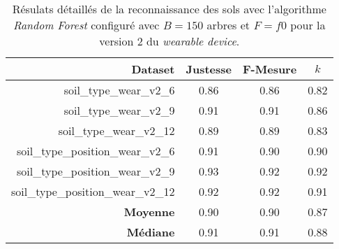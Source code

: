 \begin{table}[H]\renewcommand{\arraystretch}{0.5}
	\centering
	\caption{Résulats détaillés de la reconnaissance des sols avec l'algorithme \textit{Random Forest} configuré avec $B=150$ arbres et $F=f0$ pour la version 2 du \textit{wearable device}.}
	\label{tab:tab:rf-150-f0-wear-v2}
	\begin{tabular}{@{}rccc@{}}
		\toprule
			\textbf{Dataset} & \textbf{Justesse} & \textbf{F-Mesure} & \textbf{$k$} \\
		\midrule
			soil\_type\_wear\_v2\_6 & 0.86 & 0.86 & 0.82 \\
			soil\_type\_wear\_v2\_9 & 0.91 & 0.91 & 0.86 \\
			soil\_type\_wear\_v2\_12 & 0.89 & 0.89 & 0.83 \\
			soil\_type\_position\_wear\_v2\_6 & 0.91 & 0.90 & 0.90 \\
			soil\_type\_position\_wear\_v2\_9 & 0.93 & 0.92 & 0.92 \\
			soil\_type\_position\_wear\_v2\_12 & 0.92 & 0.92 & 0.91 \\
			\textbf{Moyenne} & 0.90 & 0.90 & 0.87 \\
			\textbf{Médiane} & 0.91 & 0.91 & 0.88 \\
		\bottomrule
	\end{tabular}
\end{table}

